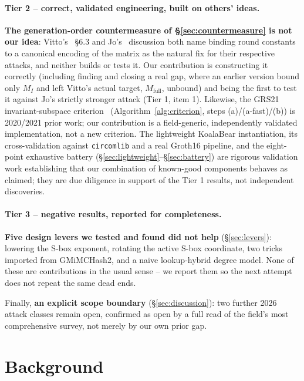 \documentclass[conference]{IEEEtran}
\theoremstyle{definition}
\theoremstyle{plain}
\begin{document}
\paragraph{Tier 2 -- correct, validated engineering, built on others'
ideas.} \textbf{The generation-order countermeasure of
\S\ref{sec:countermeasure} is not our idea}: Vitto's~\cite{slipway2026}
\S6.3 and Jo's~\cite{jo2026} discussion both name binding round
constants to a canonical encoding of the matrix as the natural fix for
their respective attacks, and neither builds or tests it. Our
contribution is constructing it correctly (including finding and closing
a real gap, where an earlier version bound only $M_I$ and left
Vitto's actual target, $M_{\mathrm{full}}$, unbound) and being the first
to test it against Jo's strictly stronger attack (Tier 1, item 1).
Likewise, the GRS21 invariant-subspace criterion~\cite{weaklayers2020}
(Algorithm~\ref{alg:criterion}, steps (a)/(a-fast)/(b)) is 2020/2021
prior work; our contribution is a field-generic, independently validated
implementation, not a new criterion. The lightweight KoalaBear
instantiation, its cross-validation against \texttt{circomlib} and a
real Groth16 pipeline, and the eight-point exhaustive battery
(\S\ref{sec:lightweight}--\S\ref{sec:battery}) are rigorous validation
work establishing that our combination of known-good components behaves
as claimed; they are due diligence in support of the Tier 1 results, not
independent discoveries.

\paragraph{Tier 3 -- negative results, reported for completeness.}
\textbf{Five design levers we tested and found did not help}
(\S\ref{sec:levers}): lowering the S-box exponent, rotating the active
S-box coordinate, two tricks imported from GMiMCHash2, and a naive
lookup-hybrid degree model. None of these are contributions in the usual
sense -- we report them so the next attempt does not repeat the same
dead ends.

Finally, \textbf{an explicit scope boundary} (\S\ref{sec:discussion}):
two further 2026 attack classes remain open, confirmed as open by a full
read of the field's most comprehensive survey, not merely by our own
prior gap.

\section{Background}
\label{sec:background}
\end{document}
